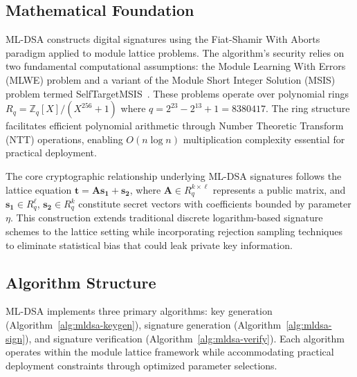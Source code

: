 \documentclass[journal=tches,final]{iacrtrans}
\begin{document}
\subsection{Mathematical Foundation}

ML-DSA constructs digital signatures using the Fiat-Shamir With Aborts paradigm applied to module lattice problems. The algorithm's security relies on two fundamental computational assumptions: the Module Learning With Errors (MLWE) problem and a variant of the Module Short Integer Solution (MSIS) problem termed SelfTargetMSIS~\cite{NIST-FIPS-204}. These problems operate over polynomial rings $R_q = \mathbb{Z}_q[X]/(X^{256} + 1)$ where $q = 2^{23} - 2^{13} + 1 = 8380417$. The ring structure facilitates efficient polynomial arithmetic through Number Theoretic Transform (NTT) operations, enabling $O(n \log n)$ multiplication complexity essential for practical deployment.

The core cryptographic relationship underlying ML-DSA signatures follows the lattice equation $\mathbf{t} = \mathbf{A}\mathbf{s_1} + \mathbf{s_2}$, where $\mathbf{A} \in R_q^{k \times \ell}$ represents a public matrix, and $\mathbf{s_1} \in R_q^\ell$, $\mathbf{s_2} \in R_q^k$ constitute secret vectors with coefficients bounded by parameter $\eta$. This construction extends traditional discrete logarithm-based signature schemes to the lattice setting while incorporating rejection sampling techniques to eliminate statistical bias that could leak private key information.

\subsection{Algorithm Structure}

ML-DSA implements three primary algorithms: key generation (Algorithm~\ref{alg:mldsa-keygen}), signature generation (Algorithm~\ref{alg:mldsa-sign}), and signature verification (Algorithm~\ref{alg:mldsa-verify}). Each algorithm operates within the module lattice framework while accommodating practical deployment constraints through optimized parameter selections.
\end{document}
